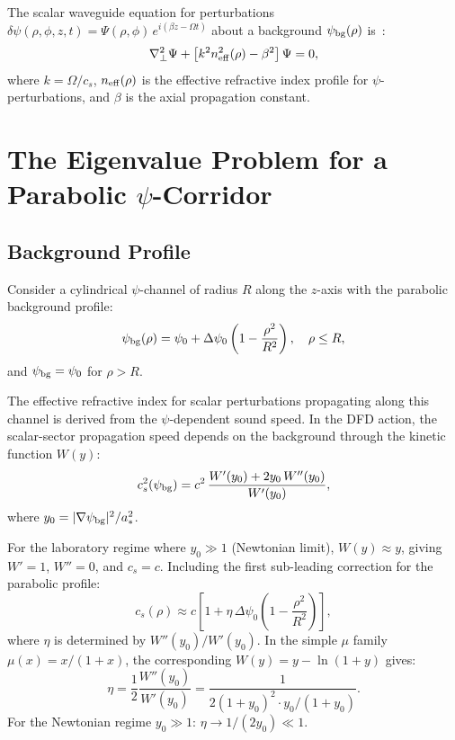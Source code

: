 \documentclass[twocolumn,superscriptaddress,prd]{revtex4-2}
\begin{document}
The scalar waveguide equation for perturbations
$\delta\psi(\rho,\phi,z,t) = \Psi(\rho,\phi)\,e^{i(\beta z - \Omega t)}$
about a background $\psi_{\rm bg}(\rho)$ is~\cite{Alcock2025P12}:
\begin{equation}
\nabla_\perp^2 \Psi + \left[k^2 n_{\rm eff}^2(\rho) - \beta^2\right]\Psi = 0,
\label{eq:waveguide-master}
\end{equation}
where $k = \Omega/c_s$, $n_{\rm eff}(\rho)$ is the effective
refractive index profile for $\psi$-perturbations, and $\beta$
is the axial propagation constant.

\section{The Eigenvalue Problem for a Parabolic $\psi$-Corridor}
\label{sec:eigenvalue}

\subsection{Background Profile}

Consider a cylindrical $\psi$-channel of radius $R$ along the
$z$-axis with the parabolic background profile:
\begin{equation}
\psi_{\rm bg}(\rho) = \psi_0 + \Delta\psi_0\left(1 - \frac{\rho^2}{R^2}\right),
\quad \rho \leq R,
\label{eq:parabolic}
\end{equation}
and $\psi_{\rm bg} = \psi_0$ for $\rho > R$.

The effective refractive index for scalar perturbations propagating
along this channel is derived from the $\psi$-dependent sound speed.
In the DFD action, the scalar-sector propagation speed depends on
the background through the kinetic function $W(y)$:
\begin{equation}
c_s^2(\psi_{\rm bg}) = c^2\,\frac{W'(y_0) + 2y_0\,W''(y_0)}{W'(y_0)},
\label{eq:sound-speed}
\end{equation}
where $y_0 = |\nabla\psi_{\rm bg}|^2/a_*^2$.

For the laboratory regime where $y_0 \gg 1$ (Newtonian limit),
$W(y) \approx y$, giving $W' = 1$, $W'' = 0$, and $c_s = c$.
Including the first sub-leading correction for the parabolic profile:
\begin{equation}
c_s(\rho) \approx c\left[1 + \eta\,\Delta\psi_0\left(1 - \frac{\rho^2}{R^2}\right)\right],
\label{eq:cs-profile}
\end{equation}
where $\eta$ is determined by $W''(y_0)/W'(y_0)$.  In the simple
$\mu$ family $\mu(x) = x/(1+x)$, the corresponding $W(y) = y - \ln(1+y)$
gives:
\begin{equation}
\eta = \frac{1}{2}\frac{W''(y_0)}{W'(y_0)} = \frac{1}{2(1+y_0)^2 \cdot y_0/(1+y_0)}.
\end{equation}
For the Newtonian regime $y_0 \gg 1$: $\eta \to 1/(2y_0) \ll 1$.
\end{document}
